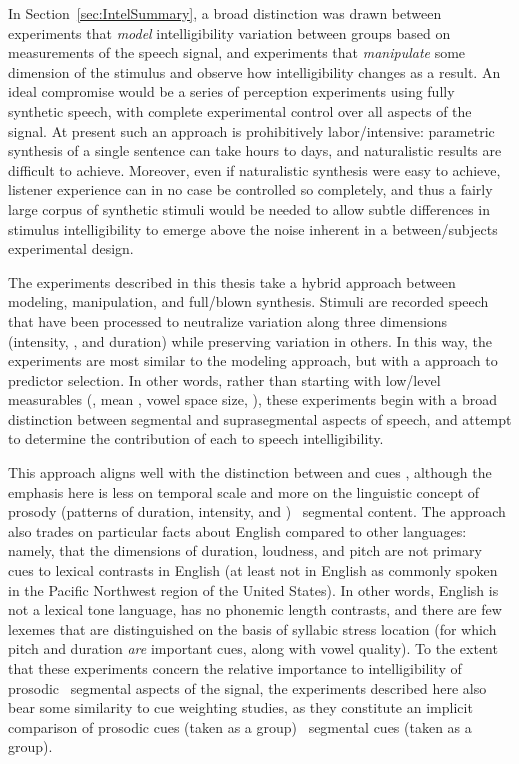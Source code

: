 
In Section~\ref{sec:IntelSummary}, a broad distinction was drawn between experiments that \emph{model} intelligibility variation between groups based on measurements of the speech signal, and experiments that \emph{manipulate} some dimension of the stimulus and observe how intelligibility changes as a result.  An ideal compromise would be a series of perception experiments using fully synthetic speech, with complete experimental control over all aspects of the signal.  At present such an approach is prohibitively labor\-/intensive: parametric synthesis of a single sentence can take hours to days, and naturalistic results are difficult to achieve.  Moreover, even if naturalistic synthesis were easy to achieve, listener experience can in no case be controlled so completely, and thus a fairly large corpus of synthetic stimuli would be needed to allow subtle differences in stimulus intelligibility to emerge above the noise inherent in a between\-/subjects experimental design.

The experiments described in this thesis take a hybrid approach between modeling, manipulation, and full\-/blown synthesis.  Stimuli are recorded speech that have been processed to neutralize variation along three dimensions (intensity, \fo, and duration) while preserving variation in others.  In this way, the experiments are most similar to the modeling approach, but with a  approach to predictor selection.  In other words, rather than starting with low\-/level measurables (\eg, mean \fo, vowel space size, \etc), these experiments begin with a broad distinction between segmental and suprasegmental aspects of speech, and attempt to determine the contribution of each to speech intelligibility.  

This approach aligns well with the distinction between  and  cues \citep{Rosen1992}, although the emphasis here is less on temporal scale and more on the linguistic concept of prosody (patterns of duration, intensity, and \fo) \vs\ segmental content.\footnotemark{}  The approach also trades on particular facts about English compared to other languages: namely, that the dimensions of duration, loudness, and pitch are not primary cues to lexical contrasts in English (at least not in English as commonly spoken in the Pacific Northwest region of the United States).  In other words, English is not a lexical tone language, has no phonemic length contrasts, and there are few lexemes that are distinguished on the basis of syllabic stress location (for which pitch and duration \emph{are} important cues, along with vowel quality).  To the extent that these experiments concern the relative importance to intelligibility of prosodic \vs\ segmental aspects of the signal, the experiments described here also bear some similarity to cue weighting studies, as they constitute an implicit comparison of prosodic cues (taken as a group) \vs\ segmental cues (taken as a group).


